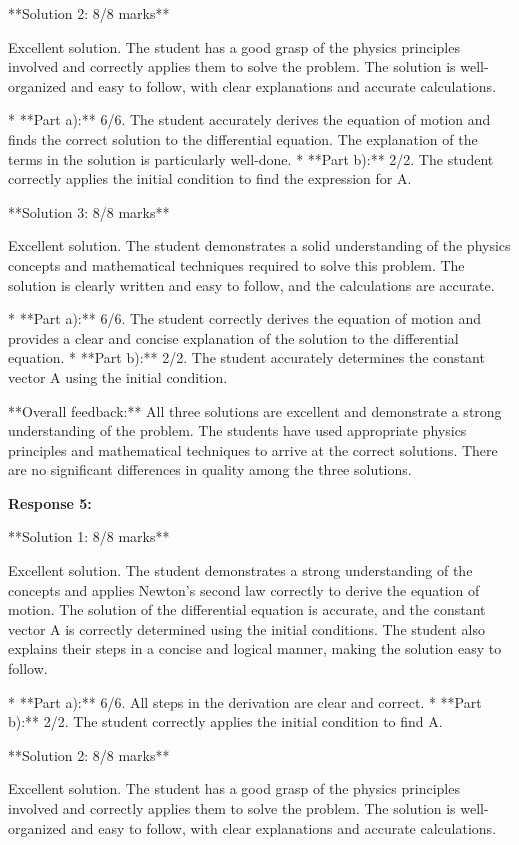 \documentclass[a4paper,11pt]{article}
\begin{document}
**Solution 2: 8/8 marks**

Excellent solution. The student has a good grasp of the physics principles involved and correctly applies them to solve the problem. The solution is well-organized and easy to follow, with clear explanations and accurate calculations.

*   **Part a):** 6/6. The student accurately derives the equation of motion and finds the correct solution to the differential equation. The explanation of the terms in the solution is particularly well-done.
*   **Part b):** 2/2. The student correctly applies the initial condition to find the expression for A.

**Solution 3: 8/8 marks**

Excellent solution. The student demonstrates a solid understanding of the physics concepts and mathematical techniques required to solve this problem. The solution is clearly written and easy to follow, and the calculations are accurate.

*   **Part a):** 6/6. The student correctly derives the equation of motion and provides a clear and concise explanation of the solution to the differential equation.
*   **Part b):** 2/2. The student accurately determines the constant vector A using the initial condition.

**Overall feedback:** All three solutions are excellent and demonstrate a strong understanding of the problem. The students have used appropriate physics principles and mathematical techniques to arrive at the correct solutions. There are no significant differences in quality among the three solutions.

\textbf{Response 5:}

**Solution 1: 8/8 marks**

Excellent solution. The student demonstrates a strong understanding of the concepts and applies Newton's second law correctly to derive the equation of motion. The solution of the differential equation is accurate, and the constant vector A is correctly determined using the initial conditions. The student also explains their steps in a concise and logical manner, making the solution easy to follow.

*   **Part a):** 6/6. All steps in the derivation are clear and correct.
*   **Part b):** 2/2. The student correctly applies the initial condition to find A.

**Solution 2: 8/8 marks**

Excellent solution. The student has a good grasp of the physics principles involved and correctly applies them to solve the problem. The solution is well-organized and easy to follow, with clear explanations and accurate calculations.
\end{document}
